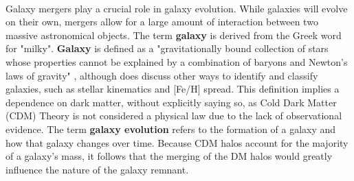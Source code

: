 \documentclass[fleqn,usenatbib]{mnras}
\begin{document}


\paragraph{} Galaxy mergers play a crucial role in galaxy evolution. While galaxies will evolve on their own, mergers allow for a large amount of interaction between two massive astronomical objects. The term \textbf{galaxy} is derived from the Greek word for "milky". \textbf{Galaxy} is defined as a "gravitationally bound collection of stars whose properties cannot be explained by a combination of baryons and Newton's laws of gravity" \citep{Willman+2012}, although \cite{Willman+2012} does discuss other ways to identify and classify galaxies, such as stellar kinematics and [Fe/H] spread. This definition implies a dependence on dark matter, without explicitly saying so, as Cold Dark Matter (CDM) Theory is not considered a physical law due to the lack of observational evidence. The term \textbf{galaxy evolution} refers to the formation of a galaxy and how that galaxy changes over time. Because CDM halos account for the majority of a galaxy's mass, it follows that the merging of the DM halos would greatly influence the nature of the galaxy remnant.
\end{document}
